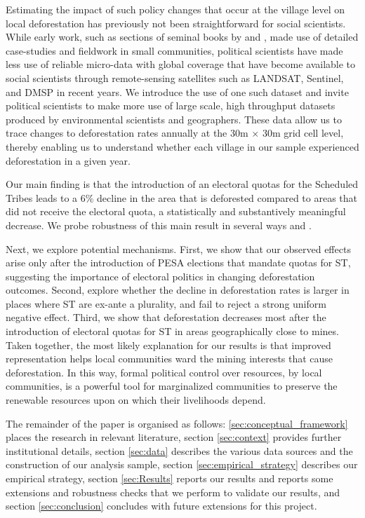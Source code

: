 \documentclass[12pt,reqno]{article}
\begin{document}
Estimating the impact of such policy changes that occur at the village level on local deforestation has previously not been straightforward for social scientists. While early work, such as sections of seminal books by \textcite{ostrom1990governing} and \textcite{ellickson1991order}, made use of detailed case-studies and fieldwork in small communities, political scientists have made less use of reliable micro-data with global coverage that have become available to social scientists through remote-sensing satellites such as LANDSAT, Sentinel, and DMSP in recent years. We introduce the use of one such dataset and invite political scientists to make more use of large scale, high throughput datasets produced by environmental scientists and geographers. These data allow us to trace changes to deforestation rates annually at the 30m $\times$ 30m grid cell level, thereby enabling us to understand whether each village in our sample experienced deforestation in a given year.

Our main finding is that the introduction of an electoral quotas for the Scheduled Tribes leads to a 6\% decline in the area that is deforested compared to areas that did not receive the electoral quota, a statistically and substantively meaningful decrease.  We probe robustness of this main result in several ways and . %

Next, we explore potential mechanisms. First, we show that our observed effects arise only after the introduction of PESA elections that mandate quotas for ST, suggesting the importance of electoral politics in changing deforestation outcomes. Second, explore whether the decline in deforestation rates is larger in places where ST are ex-ante a plurality, and fail to reject a strong uniform negative effect. Third, we show that deforestation decreases most after the introduction of electoral quotas for ST in areas geographically close to mines. Taken together, the most likely explanation for our results is that improved representation helps local communities ward the mining interests that cause  deforestation. In this way, formal political control over resources, by local communities, is a powerful tool for marginalized communities to preserve the renewable resources upon on which their livelihoods depend.

The remainder of the paper is organised as follows:
\ref{sec:conceptual_framework} places the research in relevant literature, section \ref{sec:context} provides further institutional details, section \ref{sec:data} describes the various data sources and the construction of our analysis sample, section \ref{sec:empirical_strategy} describes our empirical strategy, section \ref{sec:Results} reports our results and reports some extensions and robustness checks that we perform to validate our results, and section \ref{sec:conclusion} concludes with future extensions for this project.%
\end{document}
